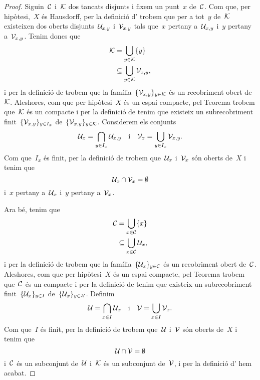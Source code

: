 \documentclass[../topologia.tex]{subfiles}
\begin{document}
    \begin{proof} %
        Siguin~\(\mathcal{C}\) i~\(\mathcal{K}\) dos tancats disjunts i fixem un punt~\(x\) de~\(\mathcal{C}\).
        Com que, per hipòtesi,~\(X\) és Hausdorff, per la definició d' trobem que per a tot~\(y\) de~\(\mathcal{K}\) existeixen dos oberts disjunts~\(\mathcal{U}_{x,y}\) i~\(\mathcal{V}_{x,y}\) tals que~\(x\) pertany a~\(\mathcal{U}_{x,y}\) i~\(y\) pertany a~\(\mathcal{V}_{x,y}\).
        Tenim doncs que
        \begin{align*}
            \mathcal{K}&=\bigcup_{y\in\mathcal{K}}\{y\} \\
            &\subseteq\bigcup_{y\in\mathcal{K}}\mathcal{V}_{x,y},
        \end{align*}
        i per la definició de  trobem que la família~\(\{\mathcal{V}_{x,y}\}_{y\in\mathcal{K}}\) és un recobriment obert de~\(\mathcal{K}\).
        Aleshores, com que per hipòtesi~\(X\) és un espai compacte, pel Teorema  trobem que~\(\mathcal{K}\) és un compacte i per la definició de  tenim que existeix un subrecobriment finit~\(\{\mathcal{V}_{x,y}\}_{y\in I_{x}}\) de~\(\{\mathcal{V}_{x,y}\}_{y\in\mathcal{K}}\).
        Considerem els conjunts
        \[
            \mathcal{U}_{x}=\bigcap_{y\in I_{x}}\mathcal{U}_{x,y}\quad\text{i}\quad\mathcal{V}_{x}=\bigcup_{y\in I_{x}}\mathcal{V}_{x,y}.
        \]
        Com que~\(I_{x}\) és finit, per la definició de  trobem que~\(\mathcal{U}_{x}\) i~\(\mathcal{V}_{x}\) són oberts de~\(X\) i tenim que
        \[
            \mathcal{U}_{x}\cap\mathcal{V}_{x}=\emptyset
        \]
        i~\(x\) pertany a~\(\mathcal{U}_{x}\) i~\(y\) pertany a~\(\mathcal{V}_{x}\).

        Ara bé, tenim que
        \begin{align*}
            \mathcal{C}&=\bigcup_{x\in\mathcal{C}}\{x\} \\
            &\subseteq\bigcup_{x\in\mathcal{C}}\mathcal{U}_{x},
        \end{align*}
        i per la definició de  trobem que la família~\(\{\mathcal{U}_{x}\}_{y\in\mathcal{C}}\) és un recobriment obert de~\(\mathcal{C}\).
        Aleshores, com que per hipòtesi~\(X\) és un espai compacte, pel Teorema  trobem que~\(\mathcal{C}\) és un compacte i per la definició de  tenim que existeix un subrecobriment finit~\(\{\mathcal{U}_{x}\}_{y\in I}\) de~\(\{\mathcal{U}_{x}\}_{y\in\mathcal{X}}\).
        Definim
        \[
            \mathcal{U}=\bigcap_{x\in I}\mathcal{U}_{x}\quad\text{i}\quad\mathcal{V}=\bigcup_{x\in I}\mathcal{V}_{x}.
        \]
        Com que~\(I\) és finit, per la definició de  trobem que~\(\mathcal{U}\) i~\(\mathcal{V}\) són oberts de~\(X\) i tenim que
        \[
            \mathcal{U}\cap\mathcal{V}=\emptyset
        \]
        i~\(\mathcal{C}\) és un subconjunt de~\(\mathcal{U}\) i~\(\mathcal{K}\) és un subconjunt de~\(\mathcal{V}\), i per la definició d' hem acabat.
    \end{proof}
\end{document}

